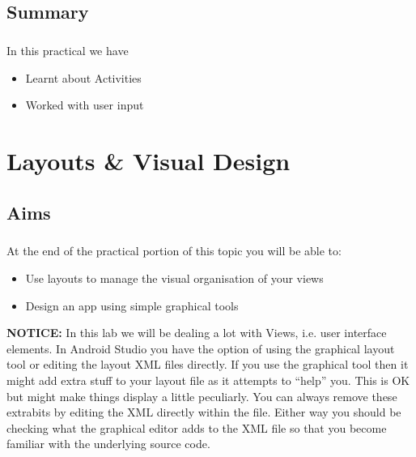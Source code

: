 \documentclass[12pt, a4paper, twoside]{book}
\begin{document}
\section{Summary}
\paragraph{} In this practical we have 

\begin{itemize}
\item Learnt about Activities
\item Worked with user input
\end{itemize}



\chapter{Layouts \& Visual Design}
\section{Aims}
\paragraph{} At the end of the practical portion of this topic you will be able to:

\begin{itemize}
\item Use layouts to manage the visual organisation of your views
\item Design an app using simple graphical tools
\end{itemize}


\begin{framed}
{\bf{NOTICE:}} In this lab we will be dealing a lot with Views, i.e. user interface elements. In Android Studio you have the option of using the graphical layout tool or editing the layout XML files directly. If you use the graphical tool then it might add extra stuff to your layout file as it attempts to ``help'' you. This is OK but might make things display a little peculiarly. You can always remove these extrabits by editing the XML directly within the file. Either way you should be checking what the graphical editor adds to the XML file so that you become familiar with the underlying source code.
\end{framed}
\end{document}
